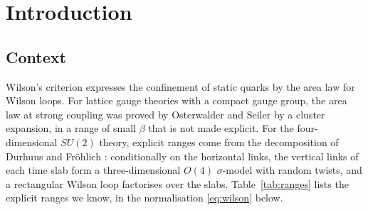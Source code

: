 \documentclass[11pt,a4paper]{article}
\theoremstyle{plain}
\theoremstyle{remark}
\numberwithin{equation}{section}
\begin{document}
\tableofcontents

\section{Introduction}\label{sec:intro}

\subsection{Context}
Wilson's criterion \cite{Wil74} expresses the confinement of static quarks by the area law for Wilson loops. For lattice gauge
theories with a compact gauge group, the area law at strong coupling was proved by Osterwalder and Seiler \cite[Thm.~5.1]{OS78} by
a cluster expansion, in a range of small $\beta$ that is not made explicit. For the four-dimensional $SU(2)$ theory, explicit ranges
come from the decomposition of Durhuus and Fr\"ohlich \cite{DF80}: conditionally on the horizontal links, the vertical links of each
time slab form a three-dimensional $O(4)$ $\sigma$-model with random twists, and a rectangular Wilson loop factorises over the slabs.
Table~\ref{tab:ranges} lists the explicit ranges we know, in the normalisation \eqref{eq:wilson} below.
\end{document}
